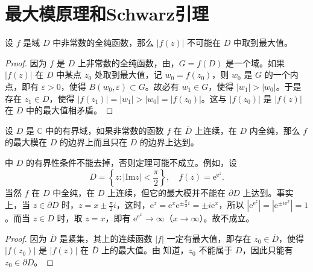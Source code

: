 \documentclass[../../main.tex]{subfiles}
\begin{document}
\section{最大模原理和Schwarz引理}

\begin{theorem}[最大模原理]\label{theorem:最大模原理-定理4.5.1}
设 \( f \) 是域 \( D \) 中非常数的全纯函数，那么 \( |f(z)| \) 不可能在 \( D \) 中取到最大值。
\end{theorem}
\begin{proof}
因为 \( f \) 是 \( D \) 上非常数的全纯函数，由，\( G = f(D) \) 是一个域。如果 \( |f(z)| \) 在 \( D \) 中某点 \( z_0 \) 处取到最大值，记 \( w_0 = f(z_0) \)，则 \( w_0 \) 是 \( G \) 的一个内点，即有 \( \varepsilon > 0 \)，使得 \( B(w_0, \varepsilon) \subset G \)。故必有 \( w_1 \in G \)，使得 \( |w_1| > |w_0| \)。于是存在 \( z_1 \in D \)，使得 \( |f(z_1)| = |w_1| > |w_0| = |f(z_0)| \)。这与 \( |f(z_0)| \) 是 \( |f(z)| \) 在 \( D \) 中的最大值相矛盾。 
\end{proof}

\begin{theorem}\label{theorem:定理4.5.2}
设 \( D \) 是 \( \mathbb{C} \) 中的有界域，如果非常数的函数 \( f \) 在 \( \overline{D} \) 上连续，在 \( D \) 内全纯，那么 \( f \) 的最大模在 \( D \) 的边界上而且只在 \( D \) 的边界上达到。
\end{theorem}
\begin{remark}
中 \( D \) 的有界性条件不能去掉，否则定理可能不成立。例如，设
\[
D = \left\{ z : |\text{Im} z| < \frac{\pi}{2} \right\},
\quad
f(z) = \mathrm{e}^{\mathrm{e}^z}.
\]
当然 \( f \) 在 \( D \) 中全纯，在 \( \overline{D} \) 上连续，但它的最大模并不能在 \( \partial D \) 上达到。事实上，当 \( z \in \partial D \) 时，\( z = x \pm \frac{\pi}{2}i \)，这时，\( \mathrm{e}^z = \mathrm{e}^x \mathrm{e}^{\pm \frac{\pi}{2}i} = \pm i\mathrm{e}^x \)，所以 \( |\mathrm{e}^{\mathrm{e}^z}| = |\mathrm{e}^{\pm i\mathrm{e}^x}| = 1 \)。而当 \( z \in D \) 时，取 \( z = x \)，即有 \( \mathrm{e}^{\mathrm{e}^x} \to \infty \)（\( x \to \infty \)）。故不成立。
\end{remark}
\begin{proof}
因为 \( \overline{D} \) 是紧集，其上的连续函数 \( |f| \) 一定有最大值，即存在 \( z_0 \in \overline{D} \)，使得 \( |f(z_0)| \) 是 \( |f(z)| \) 在 \( \overline{D} \) 上的最大值。由 知道，\( z_0 \) 不能属于 \( D \)，因此只能有 \( z_0 \in \partial D \)。 
\end{proof}
\end{document}
